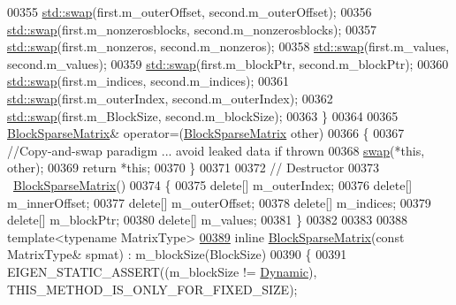 \begin{DoxyCode}
00355       \hyperlink{endian_8c_a3ca5ecd34b04d6a243c054ac3a57f68d}{std::swap}(first.m\_outerOffset, second.m\_outerOffset);
00356       \hyperlink{endian_8c_a3ca5ecd34b04d6a243c054ac3a57f68d}{std::swap}(first.m\_nonzerosblocks, second.m\_nonzerosblocks);
00357       \hyperlink{endian_8c_a3ca5ecd34b04d6a243c054ac3a57f68d}{std::swap}(first.m\_nonzeros, second.m\_nonzeros);
00358       \hyperlink{endian_8c_a3ca5ecd34b04d6a243c054ac3a57f68d}{std::swap}(first.m\_values, second.m\_values);
00359       \hyperlink{endian_8c_a3ca5ecd34b04d6a243c054ac3a57f68d}{std::swap}(first.m\_blockPtr, second.m\_blockPtr);
00360       \hyperlink{endian_8c_a3ca5ecd34b04d6a243c054ac3a57f68d}{std::swap}(first.m\_indices, second.m\_indices);
00361       \hyperlink{endian_8c_a3ca5ecd34b04d6a243c054ac3a57f68d}{std::swap}(first.m\_outerIndex, second.m\_outerIndex);
00362       \hyperlink{endian_8c_a3ca5ecd34b04d6a243c054ac3a57f68d}{std::swap}(first.m\_BlockSize, second.m\_blockSize);
00363     \}
00364 
00365     \hyperlink{group___sparse_core___module_class_eigen_1_1_block_sparse_matrix}{BlockSparseMatrix}& operator=(\hyperlink{group___sparse_core___module_class_eigen_1_1_block_sparse_matrix}{BlockSparseMatrix} other)
00366     \{
00367       \textcolor{comment}{//Copy-and-swap paradigm ... avoid leaked data if thrown}
00368       \hyperlink{endian_8c_a3ca5ecd34b04d6a243c054ac3a57f68d}{swap}(*\textcolor{keyword}{this}, other);
00369       \textcolor{keywordflow}{return} *\textcolor{keyword}{this};
00370     \}
00371 
00372     \textcolor{comment}{// Destructor}
00373     ~\hyperlink{group___sparse_core___module_class_eigen_1_1_block_sparse_matrix}{BlockSparseMatrix}()
00374     \{
00375       \textcolor{keyword}{delete}[] m\_outerIndex;
00376       \textcolor{keyword}{delete}[] m\_innerOffset;
00377       \textcolor{keyword}{delete}[] m\_outerOffset;
00378       \textcolor{keyword}{delete}[] m\_indices;
00379       \textcolor{keyword}{delete}[] m\_blockPtr;
00380       \textcolor{keyword}{delete}[] m\_values;
00381     \}
00382 
00383 
00388     \textcolor{keyword}{template}<\textcolor{keyword}{typename} MatrixType>
\hyperlink{group___sparse_core___module_a1d5e6091b3a85a872f10a02265c3c8c6}{00389}     \textcolor{keyword}{inline} \hyperlink{group___sparse_core___module_a1d5e6091b3a85a872f10a02265c3c8c6}{BlockSparseMatrix}(\textcolor{keyword}{const} MatrixType& spmat) : m\_blockSize(BlockSize)
00390     \{
00391       EIGEN\_STATIC\_ASSERT((m\_blockSize != \hyperlink{namespace_eigen_ad81fa7195215a0ce30017dfac309f0b2}{Dynamic}), THIS\_METHOD\_IS\_ONLY\_FOR\_FIXED\_SIZE);

\end{DoxyCode}
